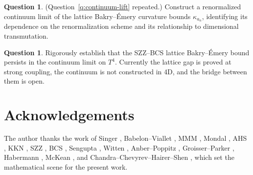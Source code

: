 \documentclass[11pt,letterpaper]{article}
\theoremstyle{definition}
\newtheorem{question}[theorem]{Question}
\begin{document}
\begin{question}\label{q:bridge-formalized}
(Question~\ref{q:continuum-lift} repeated.) Construct a renormalized continuum limit of the lattice Bakry--\'Emery curvature bounds $\kappa_{a_n}$, identifying its dependence on the renormalization scheme and its relationship to dimensional transmutation.
\end{question}

\begin{question}\label{q:T4-rigorous}
Rigorously establish that the SZZ--BCS lattice Bakry--\'Emery bound persists in the continuum limit on $T^4$. Currently the lattice gap is proved at strong coupling, the continuum is not constructed in 4D, and the bridge between them is open.
\end{question}

\section*{Acknowledgements}

The author thanks the work of Singer \cite{Singer1981}, Babelon--Viallet \cite{BabelonViallet1981}, MMM \cite{MMM2019}, Mondal \cite{Mondal2023}, AHS \cite{AHS1978}, KKN \cite{KKN1998}, SZZ \cite{SZZ2022}, BCS \cite{BCS2025}, Sengupta \cite{Sengupta1997}, Witten \cite{Witten1982}, Anber--Poppitz \cite{AnberPoppitz2025}, Groisser--Parker \cite{GP1987}, Habermann \cite{Habermann1993}, McKean \cite{McKean1970}, and Chandra--Chevyrev--Hairer--Shen \cite{CCHS2022}, which set the mathematical scene for the present work.
\end{document}
